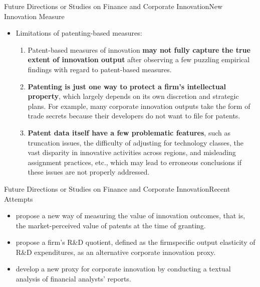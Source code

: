 \documentclass{beamer}
\begin{document}
    \begin{frame}{Future Directions or Studies on Finance and Corporate Innovation}{New Innovation Measure}
        \vspace{-0.5cm}
        \begin{itemize}
            \item Limitations of patenting-based measures:
            \begin{enumerate}
                \item Patent-based measures of innovation \textbf{may not fully capture the true extent of innovation output} after observing a few puzzling empirical findings with regard to patent-based measures.
                \item \textbf{Patenting is just one way to protect a firm's intellectual property}, which largely depends on its own discretion and strategic plans. For example, many corporate innovation outputs take the form of trade secrets because their developers do not want to file for patents.
                \item \textbf{Patent data itself have a few problematic features}, such as truncation issues, the difficulty of adjusting for technology classes, the vast disparity in innovative activities across regions, and misleading assignment practices, etc., which may lead to erroneous conclusions if these issues are not properly addressed.
            \end{enumerate}
        \end{itemize}
    \end{frame}

    \begin{frame}{Future Directions or Studies on Finance and Corporate Innovation}{Recent Attempts}
        \vspace{-1cm}
        \begin{itemize}
            \item \citet{KPSS2017TechnologicalInnovationResource} propose a new way of measuring the value of innovation outcomes, that is, the market-perceived value of patents at the time of granting.
            \item \citet{CKY2018MeasuringInnovation} propose a firm's R\&D quotient, defined as the firmspecific output elasticity of R\&D expenditures, as an alternative corporate innovation proxy.
            \item \citet{BBC2021TextBasedAnalysisCorporate} develop a new proxy for corporate innovation by conducting a textual analysis of financial analysts' reports.
        \end{itemize}
    \end{frame}
\end{document}
